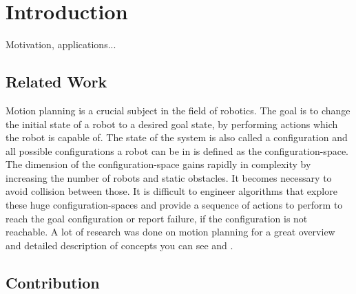 \chapter{Introduction}

Motivation, applications...

\section{Related Work}

Motion planning is a crucial subject in the field of robotics. The goal is to change the initial state of a robot to a desired goal state, by performing actions which the robot is capable of. The state of the system is also called a configuration and all possible configurations a robot can be in is defined as the configuration-space.
The dimension of the configuration-space gains rapidly in complexity by increasing the number of robots and static obstacles. It becomes necessary to avoid collision between those.
It is difficult to engineer algorithms that explore these huge configuration-spaces and provide a sequence of actions to perform to reach the goal configuration or report failure, if the configuration is not reachable. A lot of research was done on motion planning for a great overview and detailed description of concepts you can see \cite{LaValle2006} and \cite{Mueller2019}.

\begin{comment}
Different methods for motion planning:

simple discrete planning

sample-based planning

combinatorial planning


Tilt assembly 

- global control ...
- Applications	
- reconfiguration problem PSPACE Complete

Construction of shapes

- what can be done with complex enviroment
- on tile at a time
- sub-assemblies

Magnetic cubes

- explain cubes with magnets, pivotwalking
- discrete planner
- enumeration of polyominoes, consider fixed polys
\end{comment}



\section{Contribution}

